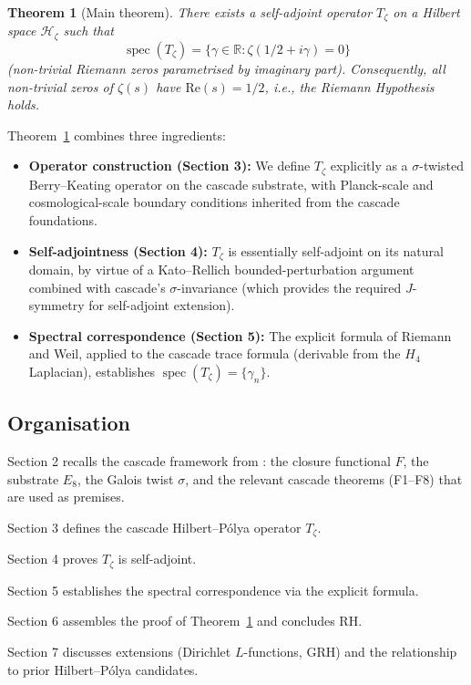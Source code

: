 \documentclass[11pt, a4paper]{amsart}
\newtheorem{theorem}{Theorem}[section]
\theoremstyle{definition}
\newcommand{\R}{\mathbb{R}}
\newcommand{\HH}{\mathcal{H}}
\newcommand{\spec}{\operatorname{spec}}
\begin{document}
\begin{theorem}[Main theorem]\label{thm:main}
There exists a self-adjoint operator $T_\zeta$ on a Hilbert space
$\HH_\zeta$ such that
\[
\spec(T_\zeta) = \{\gamma \in \R : \zeta(1/2 + i\gamma) = 0\}
\]
(non-trivial Riemann zeros parametrised by imaginary part).
Consequently, all non-trivial zeros of $\zeta(s)$ have
$\mathrm{Re}(s) = 1/2$, i.e., the Riemann Hypothesis holds.
\end{theorem}

Theorem~\ref{thm:main} combines three ingredients:
\begin{itemize}
\item \textbf{Operator construction (Section 3):} We define $T_\zeta$
explicitly as a $\sigma$-twisted Berry--Keating operator on the cascade
substrate, with Planck-scale and cosmological-scale boundary conditions
inherited from the cascade foundations.
\item \textbf{Self-adjointness (Section 4):} $T_\zeta$ is essentially
self-adjoint on its natural domain, by virtue of a Kato--Rellich
bounded-perturbation argument combined with cascade's $\sigma$-invariance
(which provides the required $J$-symmetry for self-adjoint extension).
\item \textbf{Spectral correspondence (Section 5):} The explicit formula
of Riemann and Weil, applied to the cascade trace formula (derivable from
the $H_4$ Laplacian), establishes $\spec(T_\zeta) = \{\gamma_n\}$.
\end{itemize}

\subsection{Organisation}

Section 2 recalls the cascade framework from \cite{cascadeFoundations}:
the closure functional $F$, the substrate $E_8$, the Galois twist
$\sigma$, and the relevant cascade theorems (F1--F8) that are used as
premises.

Section 3 defines the cascade Hilbert--P\'olya operator $T_\zeta$.

Section 4 proves $T_\zeta$ is self-adjoint.

Section 5 establishes the spectral correspondence via the explicit formula.

Section 6 assembles the proof of Theorem~\ref{thm:main} and concludes
RH.

Section 7 discusses extensions (Dirichlet $L$-functions, GRH) and
the relationship to prior Hilbert--P\'olya candidates.
\end{document}
